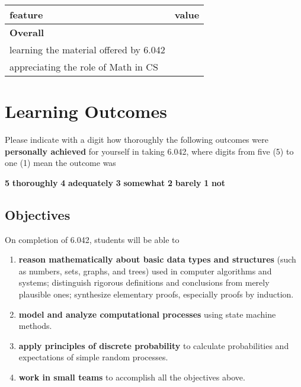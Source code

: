 \documentclass[handout]{mcs}
\begin{document}
\begin{center}
\begin{tabular}{| l | c |}
\hline
\hspace{1in} feature &  value\\  %
\hline  \hline
\textbf{Overall} \\ \hline \hline
learning the material offered by 6.042 & \\  \hline
appreciating the role of Math in CS  & \\  \hline
\end{tabular}
\end{center}


\section*{Learning Outcomes}

Please indicate with a digit how thoroughly the following outcomes
were \textbf{personally achieved} for yourself in taking 6.042, where
digits from five (5) to one (1) mean the outcome was
\begin{center}
\textbf{5}  \textbf{thoroughly} \qquad
\textbf{4}  \textbf{adequately}\qquad
\textbf{3} \textbf{somewhat}\qquad
\textbf{2} \textbf{barely}\qquad
\textbf{1} \textbf{not}
\end{center}

\iffalse

\subsection{Objectives}
On completion of 6.042, students will be able to
\begin{enumerate}
\item
\label{Basic Discrete Mathematics Concepts}
\textbf{reason mathematically about basic data types and structures} (such
as numbers, sets, graphs, and trees) used in computer algorithms and
systems; distinguish rigorous definitions and conclusions from merely
plausible ones; synthesize elementary proofs, especially proofs by
induction.\brule{0.5in}

\item
\label{Computational Processes} 
\textbf{model and analyze computational processes} using state machine
methods.\brule{0.5in}

\item \label{Discrete Probability} \textbf{apply principles of discrete
probability} to calculate probabilities and expectations of simple random
processes.\brule{0.5in}

\item 
\label{teams} 
\textbf{work in small teams} to accomplish all the objectives above.\brule{0.5in}
\end{enumerate}
\end{document}
